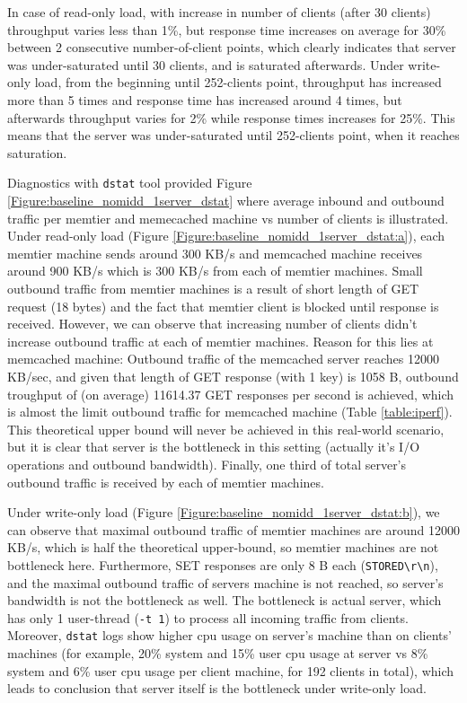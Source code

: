 \documentclass[11pt,a4paper]{article}
\begin{document}
In case of read-only load, with increase in number of clients (after 30 clients) throughput varies less than 1\%, but response time increases on average for 30\% between 2 consecutive number-of-client points, which clearly indicates that server was under-saturated until 30 clients, and is saturated afterwards. Under write-only load, from the beginning until 252-clients point, throughput has increased more than 5 times and response time has increased around 4 times, but afterwards throughput varies for 2\% while response times increases for 25\%. This means that the server was under-saturated until 252-clients point, when it reaches saturation.

Diagnostics with \texttt{dstat} tool provided Figure \ref{Figure:baseline_nomidd_1server_dstat} where average inbound and outbound traffic per memtier and memecached machine vs number of clients is illustrated. Under read-only load (Figure \ref{Figure:baseline_nomidd_1server_dstat:a}), each memtier machine sends around 300 KB/s and memcached machine receives around 900 KB/s which is 300 KB/s from each of memtier machines. Small outbound traffic from memtier machines is a result of short length of GET request (18 bytes) and the fact that memtier client is blocked until response is received. However, we can observe that increasing number of clients didn't increase outbound traffic at each of memtier machines. Reason for this lies at memcached machine: Outbound traffic of the memcached server reaches 12000 KB/sec, and given that length of GET response (with 1 key) is 1058 B, outbound troughput of (on average) 11614.37 GET responses per second is achieved, which is almost the limit outbound traffic for memcached machine (Table \ref{table:iperf}). This theoretical upper bound will never be achieved in this real-world scenario, but it is clear that server is the bottleneck in this setting (actually it's I/O operations and outbound bandwidth). Finally, one third of total server's outbound traffic is received by each of memtier machines.

Under write-only load (Figure \ref{Figure:baseline_nomidd_1server_dstat:b}), we can observe that maximal outbound traffic of memtier machines are around 12000 KB/s, which is half the theoretical upper-bound, so memtier machines are not bottleneck here. Furthermore, SET responses are only 8 B each (\texttt{STORED\textbackslash r\textbackslash n}), and the maximal outbound traffic of servers machine is not reached, so server's bandwidth is not the bottleneck as well. The bottleneck is actual server, which has only 1 user-thread (\texttt{-t 1}) to process all incoming traffic from clients. Moreover, \texttt{dstat} logs show higher cpu usage on server's machine than on clients' machines (for example, 20\% system and 15\% user cpu usage at server vs 8\% system and 6\% user cpu usage per client machine, for 192 clients in total), which leads to conclusion that server itself is the bottleneck under write-only load.
\end{document}
